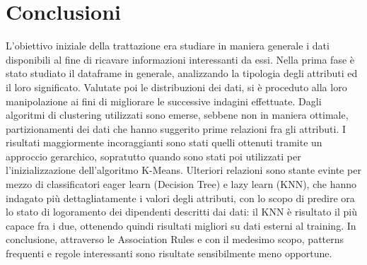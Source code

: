 \documentclass[a4paper,9pt]{article}
\begin{document}
\section{Conclusioni}
L'obiettivo iniziale della trattazione era studiare in maniera generale i dati disponibili al fine di ricavare informazioni interessanti da essi. Nella prima fase è stato studiato il dataframe in generale, analizzando la tipologia degli attributi ed il loro significato. Valutate poi le distribuzioni dei dati, si è proceduto alla loro manipolazione ai fini di migliorare le successive indagini effettuate. 
Dagli algoritmi di clustering utilizzati sono emerse, sebbene non in maniera ottimale, partizionamenti dei dati che hanno suggerito prime relazioni fra gli attributi. I risultati maggiormente incoraggianti sono stati quelli ottenuti tramite un approccio gerarchico, sopratutto quando sono stati poi utilizzati per l'inizializzazione dell'algoritmo K-Means.
Ulteriori relazioni sono stante evinte per mezzo di classificatori eager learn (Decision Tree) e lazy learn (KNN), che hanno indagato più dettagliatamente i valori degli attributi, con lo scopo di predire ora lo stato di logoramento dei dipendenti descritti dai dati: il KNN è risultato il più capace fra i due, ottenendo quindi risultati migliori su dati esterni al training. 
In conclusione, attraverso le Association Rules e con il medesimo scopo, patterns frequenti e regole interessanti sono risultate sensibilmente meno opportune.
\end{document}
